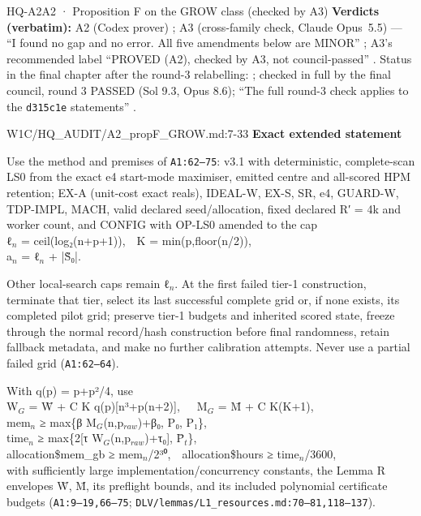 \begin{card}{HQ-A2}{A2 · Proposition F on the GROW class (checked by A3)}
\textbf{Verdicts (verbatim):} A2 (Codex prover)  ; A3 (cross-family check, Claude Opus~5.5)  — ``I found no gap and no error. All five amendments below are MINOR'' ; A3's recommended label ``PROVED (A2), checked by A3, not council-passed'' . Status in the final chapter after the round-3 relabelling: ; checked in full by the final council, round 3 PASSED (Sol 9.3, Opus 8.6); ``The full round-3 check applies to the \texttt{d315c1e} statements'' .
\begin{stmt}{W1C/HQ_AUDIT/A2_propF_GROW.md:7-33}
\textbf{Exact extended statement}

Use the method and premises of \texttt{A1:62–75}: v3.1 with deterministic, complete-scan LS0 from the exact e4 start-mode maximiser, emitted centre and all-scored HPM retention; EX-A (unit-cost exact reals), IDEAL-W, EX-S, SR, e4, GUARD-W, TDP-IMPL, MACH, valid declared seed/allocation, fixed declared R′ = 4k and worker count, and CONFIG with OP-LS0 amended to the cap\\
\hspace*{2em}ℓ$_{n}$ = ceil(log₂(n+p+1)),\ \ K = min(p,floor(n/2)),\\
\hspace*{2em}a$_{n}$ = ℓ$_{n}$ + |S̃₀|.

Other local-search caps remain ℓ$_{n}$. At the first failed tier-1 construction, terminate that tier, select its last successful complete grid or, if none exists, its completed pilot grid; preserve tier-1 budgets and inherited scored state, freeze through the normal record/hash construction before final randomness, retain fallback metadata, and make no further calibration attempts. Never use a partial failed grid (\texttt{A1:62–64}).

With q(p) = p+p²/4, use\\
\hspace*{2em}W$_{G}$ = W̄ + C K q(p)[n³+p(n+2)],\ \ \ M$_{G}$ = M̄ + C K(K+1),\\
\hspace*{2em}mem$_{n}$ ≥ max\{β M$_{G}$(n,p$_{raw}$)+β₀, P₀, P₁\},\\
\hspace*{2em}time$_{n}$ ≥ max\{2[τ W$_{G}$(n,p$_{raw}$)+τ₀], P̄$_{t}$\},\\
\hspace*{2em}allocation\$mem\_gb ≥ mem$_{n}$/2³⁰,\ \ allocation\$hours ≥ time$_{n}$/3600,\\
with sufficiently large implementation/concurrency constants, the Lemma R envelopes W̄, M̄, its preflight bounds, and its included polynomial certificate budgets (\texttt{A1:9–19,66–75}; \texttt{DLV/lemmas/L1\_resources.md:70–81,118–137}).


\end{stmt}
\end{card}
